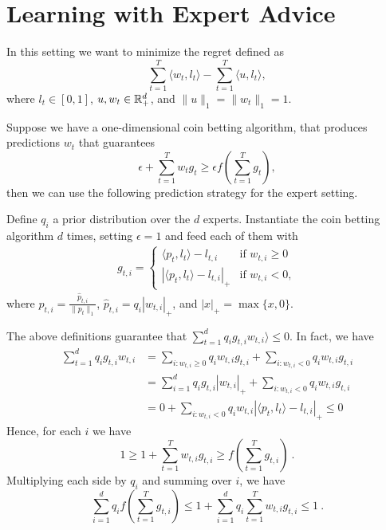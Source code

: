 \section{Learning with Expert Advice}

In this setting we want to minimize the regret defined as
\[
\sum_{t=1}^T \langle w_t, l_t \rangle - \sum_{t=1}^T \langle u, l_t \rangle,
\]
where $l_t \in [0,1]$, $u, w_t \in \mathbb{R}^d_+$, and $\|u\|_1=\|w_t\|_1=1$.

Suppose we have a one-dimensional coin betting algorithm, that produces predictions $w_t$ that guarantees
\[
\epsilon + \sum_{t=1}^T w_t g_t \geq \epsilon f(\sum_{t=1}^T g_t),
\]
then we can use the following prediction strategy for the expert setting.

Define $q_i$ a prior distribution over the $d$ experts.
Instantiate the coin betting algorithm $d$ times, setting $\epsilon =1$ and feed each of them with
\begin{align}
g_{t,i} = \begin{cases}
\langle p_t, l_t\rangle - l_{t,i} & \text{if } w_{t,i} \geq 0 \\
|\langle p_t, l_t\rangle - l_{t,i}|_+ & \text{if } w_{t,i} < 0,
\end{cases}
\end{align}
where $p_{t,i} = \frac{\hat{p}_{t,i}}{\|p_{t}\|_1}$, $\hat{p}_{t,i}=q_i |w_{t,i}|_+$, and $|x|_+=\max\{x,0\}$.

The above definitions guarantee that $\sum_{t=1}^d q_i g_{t,i} w_{t,i}\rangle \leq 0$. In fact, we have
\begin{align*}
\sum_{t=1}^d q_i g_{t,i} w_{t,i}
&= \sum_{i:w_{t,i}\geq0} q_i w_{t,i} g_{t,i} + \sum_{i:w_{t,i}<0} q_i w_{t,i} g_{t,i} \\
&= \sum_{i=1}^d q_i g_{t,i} |w_{t,i}|_+ + \sum_{i:w_{t,i}<0} q_i w_{t,i} g_{t,i} \\
&= 0 + \sum_{i:w_{t,i}<0} q_i w_{t,i} |\langle p_t, l_t\rangle - l_{t,i}|_+ \leq 0
\end{align*}
Hence, for each $i$ we have
\[
1 \geq 1+\sum_{t=1}^T w_{t,i} g_{t,i} \geq f(\sum_{t=1}^T g_{t,i})~.
\]
Multiplying each side by $q_i$ and summing over $i$, we have
\begin{equation}
\label{eq:bounded_potential}
\sum_{i=1}^d q_i f(\sum_{t=1}^T g_{t,i}) \leq 1 + \sum_{i=1}^d q_i \sum_{t=1}^T w_{t,i} g_{t,i} \leq 1~.
\end{equation}

